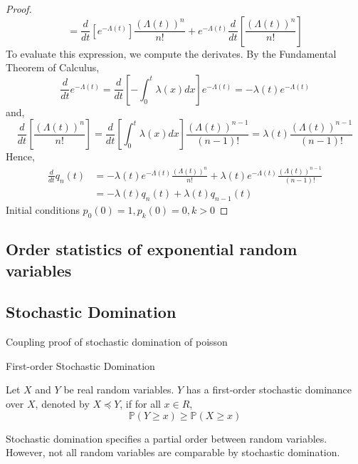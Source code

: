 \begin{proof}
$$		= \frac{d}{dt} \left[ e^{-\Lambda (t)}\right] \frac{(\Lambda(t))^n}{n!} + e^{-\Lambda (t)} \frac{d}{dt} \left[ \frac{(\Lambda(t))^n}{n!} \right]
	$$
	To evaluate this expression, we compute the derivates. By the Fundamental Theorem of Calculus,
	$$
		\frac{d}{dt} e^{-\Lambda (t)} 
		= \frac{d}{dt} \left[ - \int_0^t \lambda(x) dx \right] e^{-\Lambda (t)} 
		= - \lambda(t)  e^{-\Lambda (t)}
	$$
	and, 
	$$
		\frac{d}{dt} \left[ \frac{(\Lambda(t))^n}{n!} \right] 
		= \frac{d}{dt} \left[ \int_0^t \lambda(x) dx \right] \frac{(\Lambda(t))^{n-1}}{(n-1)!}
		= \lambda(t) \frac{(\Lambda(t))^{n-1}}{(n-1)!}
	$$
	Hence,
	\begin{align*}
		\frac{d}{dt} q_n(t) 
		&= - \lambda(t) e^{-\Lambda (t)} \frac{(\Lambda(t))^n}{n!} + \lambda(t) e^{-\Lambda (t)} \frac{(\Lambda(t))^{n-1}}{(n-1)!} \\
		&= -\lambda(t)q_n(t) + \lambda(t)q_{n-1}(t)
	\end{align*}
	Initial conditions
	$
		p_0(0) = 1, p_k(0) = 0, k > 0 
	$
\end{proof}



\subsection{Order statistics of exponential random variables}



\subsection{Stochastic Domination}
Coupling proof of stochastic domination of poisson 



\begin{definition}
	First-order Stochastic Domination

	\noindent
	Let $X$ and $Y$ be real random variables. $Y$ has a first-order stochastic dominance over $X$, denoted by $X \preceq Y$, if for all $x \in R$, 
	$$
		\mathbb{P}(Y \geq x) \geq \mathbb{P}(X \geq x)
	$$
\end{definition}

Stochastic domination specifies a partial order between random variables. However, not all random variables are comparable by stochastic domination. %

